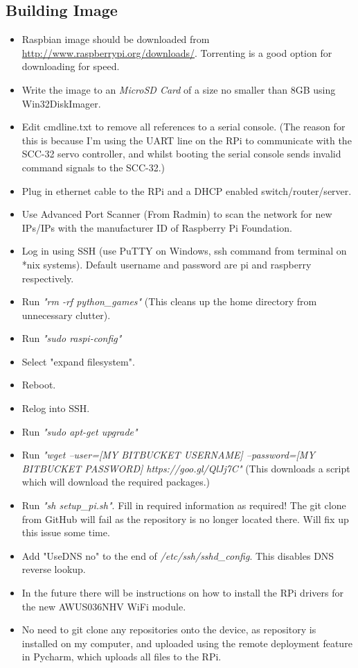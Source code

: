 			\subsection{Building Image}
            \label{raspbian_install}
				\begin{itemize}
					\item Raspbian image should be downloaded from \url{http://www.raspberrypi.org/downloads/}. Torrenting is a good option for downloading for speed.
					\item Write the image to an \textit{MicroSD Card} of a size no smaller than 8GB using Win32DiskImager.
					\item Edit cmdline.txt to remove all references to a serial console. (The reason for this is because I'm using the UART line on the RPi to communicate with the SCC-32 servo controller, and whilst booting the serial console sends invalid command signals to the SCC-32.)
					\item Plug in ethernet cable to the RPi and a DHCP enabled switch/router/server.
					\item Use Advanced Port Scanner (From Radmin) to scan the network for new IPs/IPs with the manufacturer ID of Raspberry Pi Foundation.
					\item Log in using SSH (use PuTTY on Windows, ssh command from terminal on *nix systems). Default username and password are pi and raspberry respectively.
					\item Run \textit{"rm -rf python\_games"} (This cleans up the home directory from unnecessary clutter).
					\item Run \textit{"sudo raspi-config"}
					\item Select "expand filesystem".
					\item Reboot.
					\item Relog into SSH.
					\item Run \textit{"sudo apt-get upgrade"}
					\item Run \textit{"wget --user=[MY BITBUCKET USERNAME] --password=[MY BITBUCKET PASSWORD] https://goo.gl/QlJj7C"} (This downloads a script which will download the required packages.)
					\item Run \textit{"sh setup\_pi.sh"}. Fill in required information as required! The git clone from GitHub will fail as the repository is no longer located there. Will fix up this issue some time.
					\item Add "UseDNS no" to the end of \textit{/etc/ssh/sshd\_config}. This disables DNS reverse lookup.
					\item In the future there will be instructions on how to install the RPi drivers for the new AWUS036NHV WiFi module.
					\item No need to git clone any repositories onto the device, as repository is installed on my computer, and uploaded using the remote deployment feature in Pycharm, which uploads all files to the RPi.
					
				\end{itemize}
			
